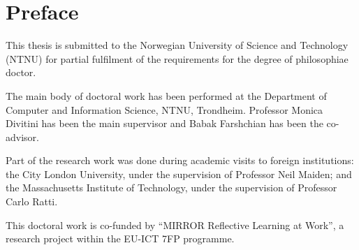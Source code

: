 \chapter{Preface}

This thesis is submitted to the Norwegian University of Science and
Technology (NTNU) for partial fulfilment of the requirements for the
degree of philosophiae doctor.

The main body of doctoral work has been performed at the Department of
Computer and Information Science, NTNU, Trondheim. Professor Monica
Divitini has been the main supervisor and Babak Farshchian has been the
co-advisor.

Part of the research work was done during academic visits to foreign
institutions: the City London University, under the supervision of Professor Neil Maiden; and the Massachusetts
Institute of Technology, under the supervision of Professor Carlo Ratti.

This doctoral work is co-funded by ``MIRROR Reflective Learning at
Work'', a research project within the EU-ICT 7FP programme.
